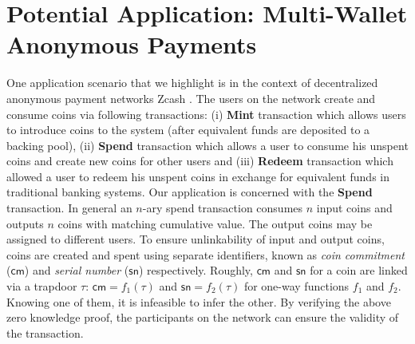 \section{Potential Application: Multi-Wallet Anonymous Payments}\label{sec:application}
One application scenario that we highlight is in the context of decentralized anonymous payment networks  Zcash \cite{zerocash}. 
The users on the network create and consume coins via following transactions: (i) {\bf Mint} transaction which allows users to introduce coins to the system (after equivalent funds are
deposited to a backing pool), (ii) {\bf Spend} transaction which allows a user to consume his unspent coins and create new coins for other users and 
(iii) {\bf Redeem} transaction which allowed a user to redeem his unspent coins in exchange for equivalent funds in traditional banking systems. Our application 
is concerned with the {\bf Spend} transaction. In general an $n$-ary spend transaction consumes $n$ input coins and outputs $n$ coins with matching 
cumulative value. The output coins may be assigned to different users. To ensure unlinkability of input and output coins, coins are created
and spent using separate identifiers, known as {\em coin commitment} ($\mathsf{cm}$) and {\em serial number} ($\mathsf{sn}$) respectively. 
Roughly, $\mathsf{cm}$
and $\mathsf{sn}$ for a coin are linked via a trapdoor $\tau$: $\mathsf{cm} = f_1(\tau)$ and $\mathsf{sn}=f_2(\tau)$ for one-way functions
$f_1$ and $f_2$. Knowing one of them, it is infeasible to infer the other.  
By verifying the above zero knowledge proof, the participants on the network can ensure the validity of the transaction.


